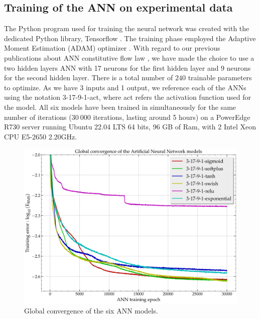 \documentclass[algorithms,article,submit,pdftex,moreauthors]{Definitions/mdpi}
\begin{document}
\subsection{Training of the ANN on experimental data}\label{subsec:train}

The Python program used for training the neural network was created with the dedicated Python library, Tensorflow \cite{Tensorflow-2015}.
The training phase employed the Adaptive Moment Estimation (ADAM) optimizer \cite{Kingma-2015-AMS}.
With regard to our previous publications about ANN constitutive flow law \cite{Pantale-2021-EIN}, we have made the choice to use a two hidden layers ANN with 17 neurons for the first hidden layer and 9 neurons for the second hidden layer. 
There is a total number of $240$ trainable parameters to optimize.
As we have 3 inputs and 1 output, we reference each of the ANNs using the notation 3-17-9-1-act, where act refers the activation function used for the model.
All six models have been trained in simultaneously for the same number of iterations ($30~000$ iterations, lasting around 5 hours) on a PowerEdge R730 server running Ubuntu 22.04 LTS 64 bits, 96 GB of Ram, with 2 Intel Xeon CPU E5-2650 2.20GHz.


\begin{figure}[h]
\centering
\includegraphics[width=0.8\columnwidth]{Figures/3Cr2Mo-convergence-17-9}
\caption{Global convergence of the six ANN models.}
\label{fig:ANN-conv}
\end{figure}
\end{document}
